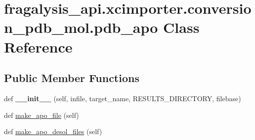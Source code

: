 \hypertarget{classfragalysis__api_1_1xcimporter_1_1conversion__pdb__mol_1_1pdb__apo}{}\section{fragalysis\+\_\+api.\+xcimporter.\+conversion\+\_\+pdb\+\_\+mol.\+pdb\+\_\+apo Class Reference}
\label{classfragalysis__api_1_1xcimporter_1_1conversion__pdb__mol_1_1pdb__apo}
\subsection*{Public Member Functions}
\begin{DoxyCompactItemize}
\item 
\mbox{\label{classfragalysis__api_1_1xcimporter_1_1conversion__pdb__mol_1_1pdb__apo_a4653e7fd666b7fd8e5bc4fe230e5e424}} 
def {\bfseries \+\_\+\+\_\+init\+\_\+\+\_\+} (self, infile, target\+\_\+name, R\+E\+S\+U\+L\+T\+S\+\_\+\+D\+I\+R\+E\+C\+T\+O\+RY, filebase)
\item 
def \hyperlink{classfragalysis__api_1_1xcimporter_1_1conversion__pdb__mol_1_1pdb__apo_a08488b34eeb131d43d3139ecbbdb78fb}{make\+\_\+apo\+\_\+file} (self)
\item 
def \hyperlink{classfragalysis__api_1_1xcimporter_1_1conversion__pdb__mol_1_1pdb__apo_ab88e88fe9d512e1635e5f1d61040f9f6}{make\+\_\+apo\+\_\+desol\+\_\+files} (self)
\end{DoxyCompactItemize}
